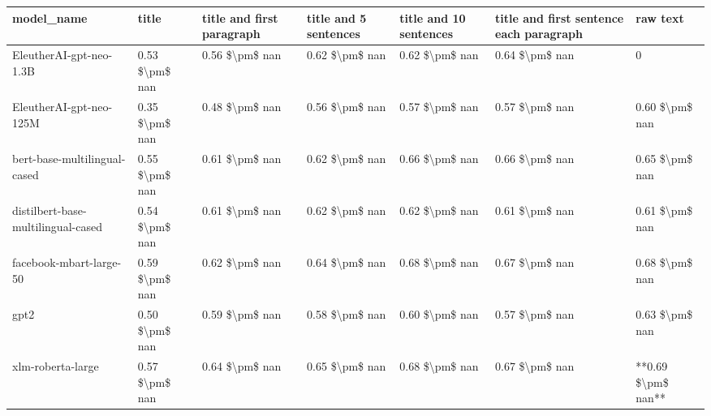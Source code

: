 \begin{tabular}{lllllll}
\toprule
                        model\_name &          title & title and first paragraph & title and 5 sentences & title and 10 sentences & title and first sentence each paragraph &           raw text \\
\midrule
           EleutherAI-gpt-neo-1.3B & 0.53 \$\textbackslash pm\$ nan &            0.56 \$\textbackslash pm\$ nan &        0.62 \$\textbackslash pm\$ nan &         0.62 \$\textbackslash pm\$ nan &                          0.64 \$\textbackslash pm\$ nan &                  0 \\
           EleutherAI-gpt-neo-125M & 0.35 \$\textbackslash pm\$ nan &            0.48 \$\textbackslash pm\$ nan &        0.56 \$\textbackslash pm\$ nan &         0.57 \$\textbackslash pm\$ nan &                          0.57 \$\textbackslash pm\$ nan &     0.60 \$\textbackslash pm\$ nan \\
      bert-base-multilingual-cased & 0.55 \$\textbackslash pm\$ nan &            0.61 \$\textbackslash pm\$ nan &        0.62 \$\textbackslash pm\$ nan &         0.66 \$\textbackslash pm\$ nan &                          0.66 \$\textbackslash pm\$ nan &     0.65 \$\textbackslash pm\$ nan \\
distilbert-base-multilingual-cased & 0.54 \$\textbackslash pm\$ nan &            0.61 \$\textbackslash pm\$ nan &        0.62 \$\textbackslash pm\$ nan &         0.62 \$\textbackslash pm\$ nan &                          0.61 \$\textbackslash pm\$ nan &     0.61 \$\textbackslash pm\$ nan \\
           facebook-mbart-large-50 & 0.59 \$\textbackslash pm\$ nan &            0.62 \$\textbackslash pm\$ nan &        0.64 \$\textbackslash pm\$ nan &         0.68 \$\textbackslash pm\$ nan &                          0.67 \$\textbackslash pm\$ nan &     0.68 \$\textbackslash pm\$ nan \\
                              gpt2 & 0.50 \$\textbackslash pm\$ nan &            0.59 \$\textbackslash pm\$ nan &        0.58 \$\textbackslash pm\$ nan &         0.60 \$\textbackslash pm\$ nan &                          0.57 \$\textbackslash pm\$ nan &     0.63 \$\textbackslash pm\$ nan \\
                 xlm-roberta-large & 0.57 \$\textbackslash pm\$ nan &            0.64 \$\textbackslash pm\$ nan &        0.65 \$\textbackslash pm\$ nan &         0.68 \$\textbackslash pm\$ nan &                          0.67 \$\textbackslash pm\$ nan & **0.69 \$\textbackslash pm\$ nan** \\
\bottomrule
\end{tabular}
